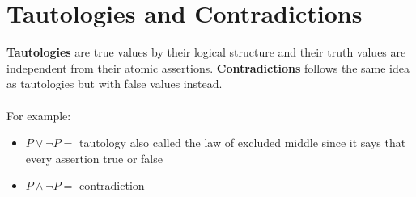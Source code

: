 \documentclass[../MATH-2000-Notes.tex]{subfiles}
\begin{document}
\section{Tautologies and Contradictions}
\textbf{Tautologies} are true values by their logical structure and their truth values are independent from their atomic assertions. \textbf{Contradictions} follows the same idea as tautologies but with false values instead.
\\~\\
For example:
\begin{itemize}
    \item \(P\vee \neg P =\) tautology also called the law of excluded middle since it says that every assertion true or false
    \item \(P \wedge \neg P = \) contradiction 
\end{itemize}
\end{document}
